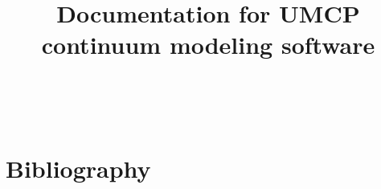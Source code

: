 \documentclass[11pt]{article}
\begin{document}




\title{ Documentation for UMCP continuum modeling software}

\maketitle

\tableofcontents

\clearpage





~\cite{Feng2006}

















\section{Bibliography}

\end{document}
